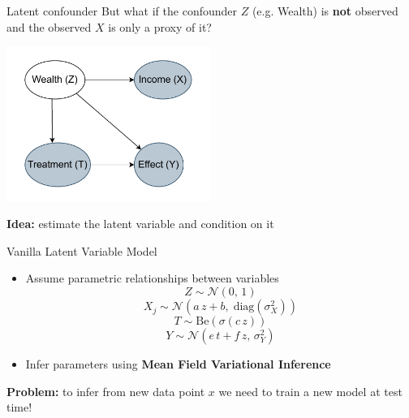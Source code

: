 \documentclass[10pt]{beamer}
\begin{document}
\begin{frame}{Latent confounder}
But what if the confounder $Z$ (e.g. Wealth) is \textbf{not} observed and the observed $X$ is only a proxy of it?
    \begin{center}
  \includegraphics[width=0.5\textwidth]{images/latent_confounder.pdf}
\end{center}
  
\textbf{Idea:} estimate the latent variable and condition on it

 \end{frame}

 \begin{frame}{Vanilla Latent Variable Model}
     \begin{itemize}
         \item Assume parametric relationships between variables
         \begin{equation*}
           Z \sim \mathcal{N}(0,\,1)
         \end{equation*}
         \begin{equation*}
           X_j \sim \mathcal{N}(a\,z + b,\; \text{diag}(\sigma_X^2))
         \end{equation*}
        \begin{equation*}
           T \sim \mathrm{Be}(\sigma(c\,z))
         \end{equation*}
        \begin{equation*}
           Y \sim \mathcal{N}(e\,t + f\,z,\,\sigma_Y^2)
         \end{equation*}
         \item Infer parameters using \textbf{Mean Field Variational Inference}
     \end{itemize}

     \alert{\textbf{Problem:}} to infer from new data point $x$ we need to train a new model at test time! 
 \end{frame}
\end{document}
